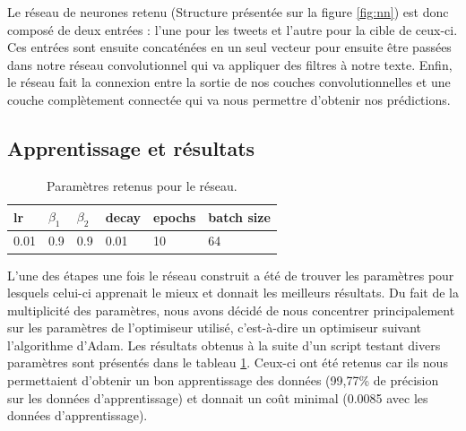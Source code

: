 \par Le réseau de neurones retenu (Structure présentée sur la figure \ref{fig:nn}) est donc composé de deux entrées : l'une pour les tweets et l'autre pour la cible de ceux-ci. Ces entrées sont ensuite concaténées en un seul vecteur pour ensuite être passées dans notre réseau convolutionnel qui va appliquer des filtres à notre texte. Enfin, le réseau fait la connexion entre la sortie de nos couches convolutionnelles et une couche complètement connectée qui va nous permettre d'obtenir nos prédictions.


\subsection{Apprentissage et résultats}

\begin{table}[h!]
	\centering
	\begin{tabular}{|l|l|l|l|l|l|}
		\hline
		\textbf{lr} & \textbf{$\beta_1$} & \textbf{$\beta_2$} & \textbf{decay} & \textbf{epochs} & \textbf{batch size} \\
		\hline
		0.01 & 0.9 & 0.9 & 0.01 & 10 & 64 \\
		\hline
	\end{tabular}
	\caption{Paramètres retenus pour le réseau.}
	\label{tab:saved_params}
\end{table}

\par L'une des étapes une fois le réseau construit a été de trouver les paramètres pour lesquels celui-ci apprenait le mieux et donnait les meilleurs résultats. Du fait de la multiplicité des paramètres, nous avons décidé de nous concentrer principalement sur les paramètres de l'optimiseur utilisé, c'est-à-dire un optimiseur suivant l'algorithme d'Adam. Les résultats obtenus à la suite d'un script testant divers paramètres sont présentés dans le tableau \ref{tab:saved_params}. Ceux-ci ont été retenus car ils nous permettaient d'obtenir un bon apprentissage des données (99,77\% de précision sur les données d'apprentissage) et donnait un coût minimal (0.0085 avec les données d'apprentissage).

\par\leavevmode\par  
\par\leavevmode\par
\par\leavevmode\par  
\par\leavevmode\par

